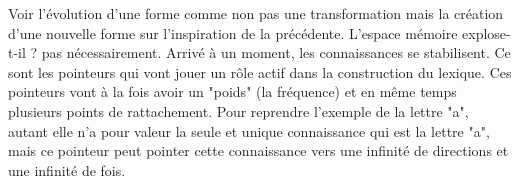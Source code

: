 \documentclass[11pt,a4paper]{article}
\begin{document}
Voir l'évolution d'une forme comme non pas une transformation mais la création d'une nouvelle forme sur l'inspiration de la précédente. L'espace mémoire explose-t-il ? pas nécessairement. Arrivé à un moment, les connaissances se stabilisent. Ce sont les pointeurs qui vont jouer un rôle actif dans la construction du lexique. Ces pointeurs vont à la fois avoir un "poids" (la fréquence) et en même temps plusieurs points de rattachement. Pour reprendre l'exemple de la lettre "a", autant elle n'a pour valeur la seule et unique connaissance qui est la lettre "a", mais ce pointeur peut pointer cette connaissance vers une infinité de directions et une infinité de fois.
\end{document}
